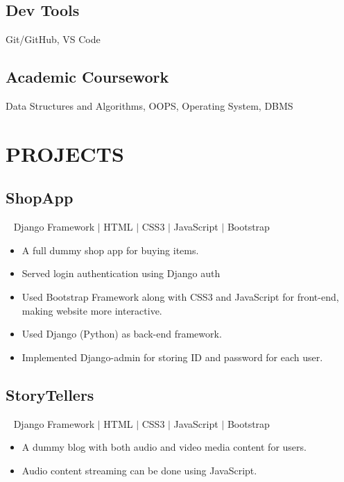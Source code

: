 \documentclass[12pt]{article}
\begin{document}
\subsection*{Dev Tools}               \hspace*{4.45cm} Git/GitHub, VS Code \\ 
\subsection*{Academic Coursework}     \hspace*{2.10cm} Data Structures and Algorithms, OOPS, Operating System, DBMS \\

\section*{PROJECTS}
\subsection*{ShopApp}~ Django Framework $\vert$ HTML $\vert$ CSS3 $\vert$ JavaScript $\vert$ Bootstrap\\
\begin{itemize}[topsep=0pt,itemsep=1pt,partopsep=1pt, parsep=1pt]
    \item A full dummy shop app for buying items. 
    \item Served login authentication using Django auth
    \item Used Bootstrap Framework along with CSS3 and JavaScript for front-end, making website more interactive.
    \item Used Django (Python) as back-end framework. 
    \item Implemented Django-admin for storing ID and password for each user. 
\end{itemize}
\subsection*{StoryTellers}~ Django Framework $\vert$ HTML $\vert$ CSS3 $\vert$ JavaScript $\vert$ Bootstrap\\
\begin{itemize}[topsep=0pt,itemsep=1pt,partopsep=1pt, parsep=1pt]
    \item A dummy blog with both audio and video media content for users.
    \item Audio content streaming can be done using JavaScript. 
\end{itemize}
\end{document}
